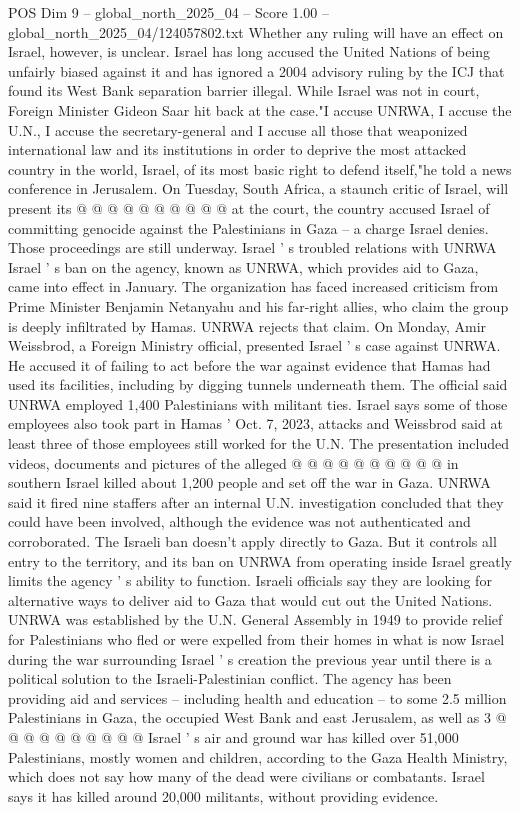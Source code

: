 \begin{textsample}{POS Dim 9 – global\_north\_2025\_04 – Score 1.00 – global\_north\_2025\_04/124057802.txt}
Whether any ruling will have an effect on Israel, however, is unclear.
Israel has long accused the United Nations of being unfairly biased against it and has ignored a 2004 advisory ruling by the ICJ that found its West Bank separation barrier illegal.
While Israel was not in court, Foreign Minister Gideon Saar hit back at the case."I accuse UNRWA, I accuse the U.N., I accuse the secretary-general and I accuse all those that weaponized international law and its institutions in order to deprive the most attacked country in the world, Israel, of its most basic right to defend itself,"he told a news conference in Jerusalem.
On Tuesday, South Africa, a staunch critic of Israel, will present its @ @ @ @ @ @ @ @ @ @ at the court, the country accused Israel of committing genocide against the Palestinians in Gaza -- a charge Israel denies.
Those proceedings are still underway.
Israel ' s troubled relations with UNRWA Israel ' s ban on the agency, known as UNRWA, which provides aid to Gaza, came into effect in January.
The organization has faced increased criticism from Prime Minister Benjamin Netanyahu and his far-right allies, who claim the group is deeply infiltrated by Hamas.
UNRWA rejects that claim.
On Monday, Amir Weissbrod, a Foreign Ministry official, presented Israel ' s case against UNRWA.
He accused it of failing to act before the war against evidence that Hamas had used its facilities, including by digging tunnels underneath them.
The official said UNRWA employed 1,400 Palestinians with militant ties.
Israel says some of those employees also took part in Hamas ' Oct. 7, 2023, attacks and Weissbrod said at least three of those employees still worked for the U.N.
The presentation included videos, documents and pictures of the alleged @ @ @ @ @ @ @ @ @ @ in southern Israel killed about 1,200 people and set off the war in Gaza.
UNRWA said it fired nine staffers after an internal U.N. investigation concluded that they could have been involved, although the evidence was not authenticated and corroborated.
The Israeli ban doesn't apply directly to Gaza.
But it controls all entry to the territory, and its ban on UNRWA from operating inside Israel greatly limits the agency ' s ability to function.
Israeli officials say they are looking for alternative ways to deliver aid to Gaza that would cut out the United Nations.
UNRWA was established by the U.N.
General Assembly in 1949 to provide relief for Palestinians who fled or were expelled from their homes in what is now Israel during the war surrounding Israel ' s creation the previous year until there is a political solution to the Israeli-Palestinian conflict.
The agency has been providing aid and services -- including health and education -- to some 2.5 million Palestinians in Gaza, the occupied West Bank and east Jerusalem, as well as 3 @ @ @ @ @ @ @ @ @ @ Israel ' s air and ground war has killed over 51,000 Palestinians, mostly women and children, according to the Gaza Health Ministry, which does not say how many of the dead were civilians or combatants.
Israel says it has killed around 20,000 militants, without providing evidence.

\end{textsample}
